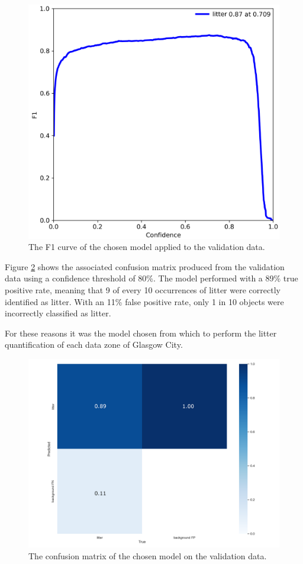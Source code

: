\documentclass{thesis}
\begin{document}
\begin{figure}[h]
    \centering
    \includegraphics[scale=0.4]{images/f1-curve.png}
    \caption{The F1 curve of the chosen model applied to the validation data.}
    \label{fig:f1-curve}
\end{figure}

Figure \ref{fig:confusion-matrix-validation} shows the associated confusion matrix produced from the validation data using a confidence threshold of 80\%. The model performed with a 89\% true positive rate, meaning that 9 of every 10 occurrences of litter were correctly identified as litter. With an 11\% false positive rate, only 1 in 10 objects were incorrectly classified as litter.

For these reasons it was the model chosen from which to perform the litter quantification of each data zone of Glasgow City.

\begin{figure}[h]
    \centering
    \includegraphics[scale=0.45]{images/final-model-confusion-matrix-val.png}
    \caption{The confusion matrix of the chosen model on the validation data.}
    \label{fig:confusion-matrix-validation}
\end{figure}
\end{document}
